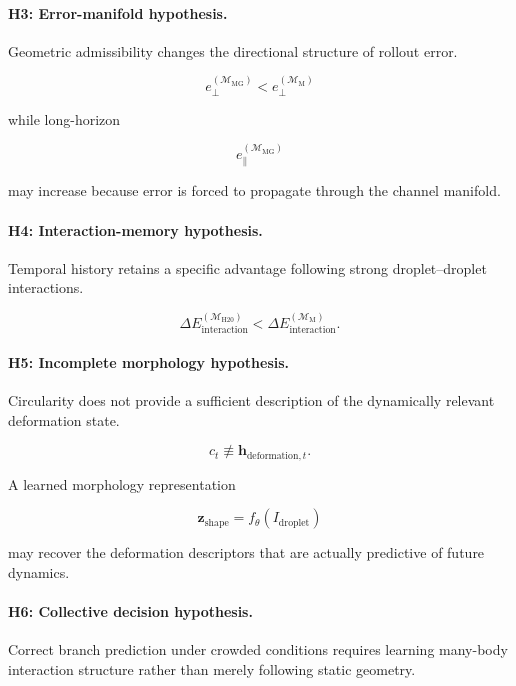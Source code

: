 \documentclass[11pt]{article}
\newcommand{\Mhist}{\mathcal{M}_{\mathrm{H20}}}
\newcommand{\Mmark}{\mathcal{M}_{\mathrm{M}}}
\newcommand{\Mgeom}{\mathcal{M}_{\mathrm{MG}}}
\begin{document}
\paragraph{H3: Error-manifold hypothesis.}
Geometric admissibility changes the directional structure of rollout error.

\begin{equation}
e_{\perp}^{(\Mgeom)}
<
e_{\perp}^{(\Mmark)}
\end{equation}

while long-horizon

\begin{equation}
e_{\parallel}^{(\Mgeom)}
\end{equation}

may increase because error is forced to propagate through the channel manifold.

\paragraph{H4: Interaction-memory hypothesis.}
Temporal history retains a specific advantage following strong droplet--droplet interactions.

\begin{equation}
\Delta E_{\mathrm{interaction}}^{(\Mhist)}
<
\Delta E_{\mathrm{interaction}}^{(\Mmark)}.
\end{equation}

\paragraph{H5: Incomplete morphology hypothesis.}
Circularity does not provide a sufficient description of the dynamically relevant deformation state.

\begin{equation}
c_t
\not\equiv
\mathbf{h}_{\mathrm{deformation},t}.
\end{equation}

A learned morphology representation

\begin{equation}
\mathbf{z}_{\mathrm{shape}}
=
f_{\theta}
\left(
I_{\mathrm{droplet}}
\right)
\end{equation}

may recover the deformation descriptors that are actually predictive of future dynamics.

\paragraph{H6: Collective decision hypothesis.}
Correct branch prediction under crowded conditions requires learning many-body interaction structure rather than merely following static geometry.
\end{document}
